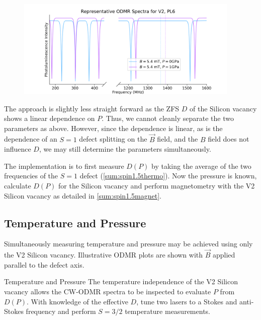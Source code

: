 \begin{figure}[h]
	\begin{center}
		\includegraphics[width=0.95\textwidth]{figures/ODMR-multimodal-s15magnet-s1P.png}
	\end{center}
	\caption{}\label{fig:multimode_BP}
\end{figure}

The approach is slightly less straight forward as the ZFS $D$ of the Silicon vacancy shows a linear dependence on $P$. Thus, we cannot cleanly separate the two parameters as above. However, since the dependence is linear, as is the dependence of an $S=1$ defect splitting on the $\vec{B}$ field, and the $B$ field does not influence $D$, we may still determine the parameters simultaneously.

The implementation is to first measure $D(P)$ by taking the average of the two frequencies of the $S=1$ defect (\ref{sum:spin1.5thermo}). Now the pressure is known, calculate $D(P)$ for the Silicon vacancy and perform magnetometry with the V2 Silicon vacancy as detailed in \ref{sum:spin1.5magnet}.


\subsection{Temperature and Pressure}\label{multi_TP}
Simultaneously measuring temperature and pressure
may be achieved using only the V2 Silicon vacancy. Illustrative ODMR plots are shown with $\vec{B}$ applied parallel to the defect axis. 

\begin{proposal}{Temperature and Pressure}
    The temperature independence of the V2 Silicon vacancy allows the CW-ODMR spectra to be inspected to evaluate $P$ from $D(P)$. 
    With knowledge of the effective $D$, tune two lasers to a Stokes and anti-Stokes frequency and perform $S=3/2$ temperature measurements. 
\end{proposal}


